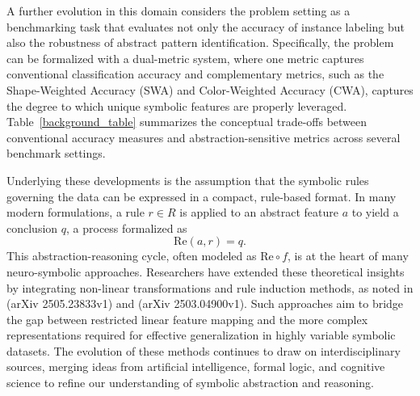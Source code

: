 \documentclass{article}
\begin{document}
A further evolution in this domain considers the problem setting as a benchmarking task that evaluates not only the accuracy of instance labeling but also the robustness of abstract pattern identification. Specifically, the problem can be formalized with a dual-metric system, where one metric captures conventional classification accuracy and complementary metrics, such as the Shape-Weighted Accuracy (SWA) and Color-Weighted Accuracy (CWA), captures the degree to which unique symbolic features are properly leveraged. Table~\ref{background_table} summarizes the conceptual trade-offs between conventional accuracy measures and abstraction-sensitive metrics across several benchmark settings.

Underlying these developments is the assumption that the symbolic rules governing the data can be expressed in a compact, rule-based format. In many modern formulations, a rule \( r \in R \) is applied to an abstract feature \( a \) to yield a conclusion \( q \), a process formalized as
\[
\text{Re}(a, r) = q.
\]
This abstraction-reasoning cycle, often modeled as \( \text{Re} \circ f \), is at the heart of many neuro-symbolic approaches. Researchers have extended these theoretical insights by integrating non-linear transformations and rule induction methods, as noted in (arXiv 2505.23833v1) and (arXiv 2503.04900v1). Such approaches aim to bridge the gap between restricted linear feature mapping and the more complex representations required for effective generalization in highly variable symbolic datasets. The evolution of these methods continues to draw on interdisciplinary sources, merging ideas from artificial intelligence, formal logic, and cognitive science to refine our understanding of symbolic abstraction and reasoning.
\end{document}

